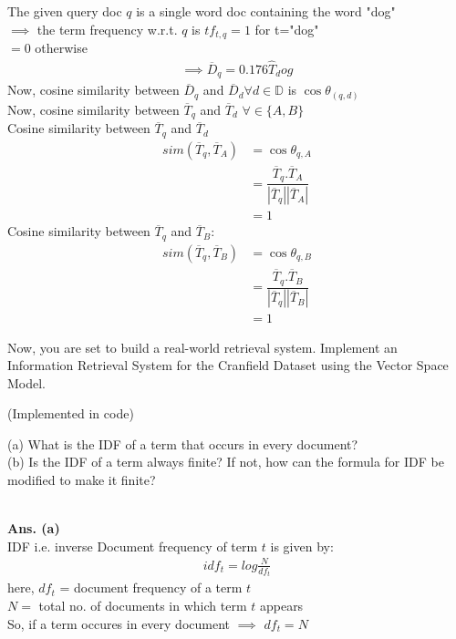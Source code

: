 \documentclass[11pt]{exam}
\newcommand\tab[1][1cm]{\hspace*{#1}}
\begin{document}
\begin{questions}
\begin{solution}
    The given query doc $q$ is a single word doc containing the word "dog"\\
    $\implies$ the term frequency w.r.t. $q$ is $tf_{t,q}=1$ for t="dog"\\
    \tab\tab\tab\tab\tab\tab\tab[4em]$=0$ otherwise\\
    \begin{align}
        \implies \overline{D}_q = 0.176\hat{T}_dog
    \end{align}
    Now, cosine similarity between $\overline{D}_q$ and $\overline{D}_d \forall d \in \mathbb{D}$ is ${\cos \theta}_{(q,d)}$\\
    Now, cosine similarity between $\overline{T}_q$ and $\overline{T}_d$ $\forall \in \{A,B\}$\\
    Cosine similarity between $\overline{T}_q$ and $\overline{T}_d$
    \begin{align*}
        sim(\overline{T}_q, \overline{T}_A) &= \cos \theta_{q,A}\\
        &=\dfrac{\overline{T}_{q}.\overline{T}_A}{|\overline{T}_q| |\overline{T}_A|}\\
        &=1
    \end{align*}
    Cosine similarity between $\overline{T}_q$ and $\overline{T}_B$:\\
    \begin{align*}
        sim(\overline{T}_q,\overline{T}_B) &= \cos\theta_{q,B}\\
        &=\dfrac{\overline{T}_{q}.\overline{T}_B}{|\overline{T}_q| |\overline{T}_B|}\\
        &=1
    \end{align*}
    
\end{solution}
\question Now, you are set to build a real-world retrieval system. Implement an Information Retrieval System for the Cranfield Dataset using the Vector Space Model.
\begin{solution}
    (Implemented in code)
\end{solution}
\question (a) What is the IDF of a term that occurs in every document?\\
(b) Is the IDF of a term always finite? If not, how can the formula for IDF be modified to
make it finite?
\begin{solution}\\
    \textbf{Ans. (a)}\\
    IDF i.e. inverse Document frequency of term $t$ is given by:
    \begin{align}
        idf_t = log{\frac{N}{df_t}}
    \end{align}
    here, $df_t$ = document frequency of a term $t$\\
    $N = $ total no. of documents in which term $t$ appears\\
    So, if a term occures in every document $\implies$ $df_t = N$ \\
    

\end{solution}
\end{questions}
\end{document}

